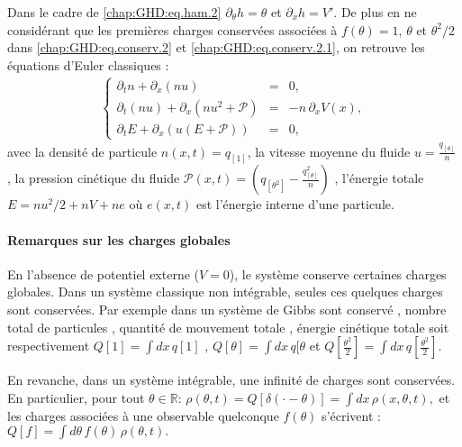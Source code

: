 Dans le cadre de \eqref{chap:GHD:eq.ham.2} \(\partial_\theta h = \theta\) et   \(\partial_x h  = V' \). De plus en ne considérant que les premières charges conservées associées à $f(\theta) = 1$, $\theta$ et $\theta^2/2$ dans \eqref{chap:GHD:eq.conserv.2} et \eqref{chap:GHD:eq.conserv.2.1}, on retrouve les équations d’Euler classiques :
\begin{eqnarray}\label{chap:3:eq:hydro.1}
	\left\{
	\begin{array}{rcl}
	\partial_t n + \partial_x (n u) &=& 0, \\
	\partial_t (n u) + \partial_x (n u^2 + \mathcal{P}) &=& -n \, \partial_x V(x), \\
	\partial_t E + \partial_x (u(E+\mathcal{P})) &=& 0,
	\end{array}
	\right .  
\end{eqnarray}
avec la densité de particule $n(x, t) = q_{[1]}$, la vitesse moyenne du fluide $u = \frac{q_{[\theta]}}{n}$ , la pression cinétique du fluide $\mathcal{P}(x, t) = \left( q_{[\theta^2]} - \frac{q_{[\theta]}^2}{n} \right)$ , l'énergie totale $E = nu^2/2 + nV + ne$ où $e(x,t)$ est l'énergie interne d'une particule.



\paragraph{Remarques sur les charges globales}
En l’absence de potentiel externe ($V = 0$), le système conserve certaines charges globales. Dans un système classique non intégrable, seules ces quelques charges sont conservées. Par exemple dans un système de Gibbs sont conservé , nombre total de particules , quantité de mouvement totale , énergie cinétique totale soit respectivement $Q[1]  =  \int dx \, q[1]$ , $Q[\theta] = \int dx \, q[\theta$ et $Q\left[\frac{\theta^2}{2}\right] = \int dx \, q\left[\frac{\theta^2}{2}\right] $. 

\medskip

En revanche, dans un système intégrable, une infinité de charges sont conservées. En particulier, pour tout $\theta \in \mathbb{R}$:
\(
\rho(\theta , t ) = Q[\delta(\cdot - \theta)] = \int dx \, \rho(x, \theta, t),
\)
et les charges associées à une observable quelconque $f(\theta)$ s’écrivent :
\(
Q[f] = \int d\theta \, f(\theta) \, \rho(\theta, t).
\)

